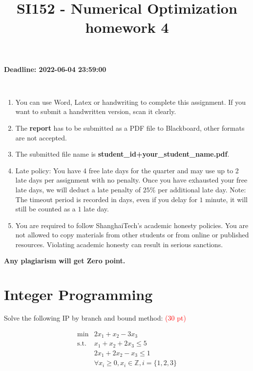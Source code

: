 \documentclass[8pt]{article}
\title{SI152 - Numerical Optimization homework 4}
\begin{document}
\date{}
\maketitle
\centerline{\Large \textbf{Deadline: 2022-06-04 23:59:00}}\\
\vspace*{30pt}
\begin{enumerate}
    \item You can use Word, Latex or handwriting to complete this assignment. If you want to submit a handwritten version, scan it clearly.
    \item The \textbf{report} has to be submitted as a PDF file to Blackboard, other formats are not accepted.
    \item The submitted file name is \textbf{student\_id+your\_student\_name.pdf}.
    \item Late policy: You have 4 free late days for the quarter and may use up to 2 late days per assignment with no penalty. Once you have exhausted your free late days, we will deduct a late penalty of $25\%$ per additional late day. Note: The timeout period is recorded in days, even if you delay for $1$ minute, it will still be counted as a $1$ late day.
    \item You are required to follow ShanghaiTech’s academic honesty policies. You are not allowed to copy materials from other students or from online or published resources. Violating academic honesty can result in serious sanctions.
\end{enumerate}

\textbf{Any plagiarism will get Zero point.}

\newpage
\section{Integer Programming}
Solve the following IP by branch and bound method: \textcolor{red}{(30 pt)}

\begin{equation}
    \label{general}
        \begin{array}{ll}
            \min & 2x_1+x_2-3x_3\\
            \text {s.t.} & x_1+x_2+2x_3\leq5\\&2x_1+2x_2-x_3\leq1\\&\forall x_i\geq0, x_i\in \mathbb{Z}, i=\{1,2,3\}
        \end{array}
\end{equation} 
\end{document}
